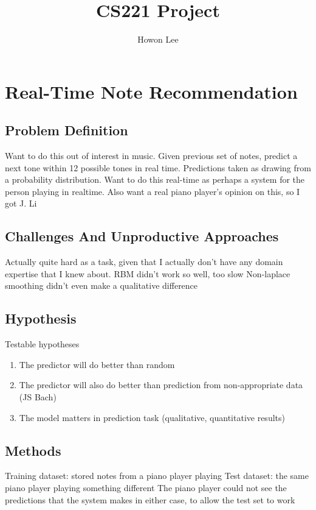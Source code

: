\documentclass{article}
\begin{document}
\title{CS221 Project}
\author{Howon Lee}
\maketitle
\section*{Real-Time Note Recommendation}

\subsection*{Problem Definition}
Want to do this out of interest in music.
Given previous set of notes, predict a next tone within 12 possible tones in real time.
Predictions taken as drawing from a probability distribution.
Want to do this real-time as perhaps a system for the person playing in realtime.
Also want a real piano player's opinion on this, so I got J. Li

\subsection*{Challenges And Unproductive Approaches}
Actually quite hard as a task, given that I actually don't have any domain expertise that I knew about.
RBM didn't work so well, too slow
Non-laplace smoothing didn't even make a qualitative difference

\subsection*{Hypothesis}
Testable hypotheses
\begin{enumerate}
    \item The predictor will do better than random
    \item The predictor will also do better than prediction from non-appropriate data (JS Bach)
    \item The model matters in prediction task (qualitative, quantitative results)
\end{enumerate}

\subsection*{Methods}
Training dataset: stored notes from a piano player playing
Test dataset: the same piano player playing something different
The piano player could not see the predictions that the system makes in either case, to allow the test set to work
\end{document}
